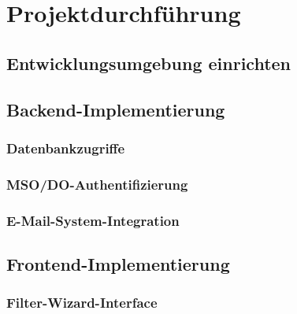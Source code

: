 \documentclass[11pt,a4paper]{article}
\begin{document}
\newpage
\section{Projektdurchführung}

\subsection{Entwicklungsumgebung einrichten}

\subsection{Backend-Implementierung}

\subsubsection{Datenbankzugriffe}

\subsubsection{MSO/DO-Authentifizierung}

\subsubsection{E-Mail-System-Integration}

\subsection{Frontend-Implementierung}
\subsubsection{Filter-Wizard-Interface}
\end{document}

